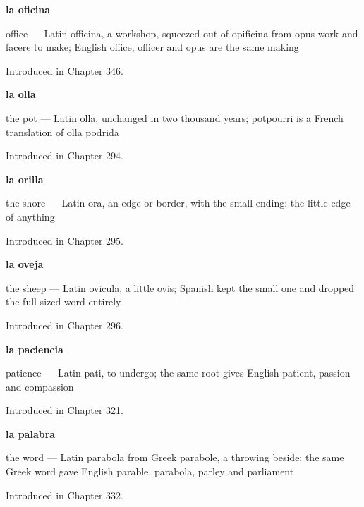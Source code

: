 \noindent\begin{minipage}[t]{\linewidth}
\raggedright
\textbf{la oficina}\par
\small office — Latin officina, a workshop, squeezed out of opificina from opus work and facere to make; English office, officer and opus are the same making\par
\footnotesize Introduced in Chapter 346.
\end{minipage}\par\medskip

\noindent\begin{minipage}[t]{\linewidth}
\raggedright
\textbf{la olla}\par
\small the pot — Latin olla, unchanged in two thousand years; potpourri is a French translation of olla podrida\par
\footnotesize Introduced in Chapter 294.
\end{minipage}\par\medskip

\noindent\begin{minipage}[t]{\linewidth}
\raggedright
\textbf{la orilla}\par
\small the shore — Latin ora, an edge or border, with the small ending: the little edge of anything\par
\footnotesize Introduced in Chapter 295.
\end{minipage}\par\medskip

\noindent\begin{minipage}[t]{\linewidth}
\raggedright
\textbf{la oveja}\par
\small the sheep — Latin ovicula, a little ovis; Spanish kept the small one and dropped the full-sized word entirely\par
\footnotesize Introduced in Chapter 296.
\end{minipage}\par\medskip

\noindent\begin{minipage}[t]{\linewidth}
\raggedright
\textbf{la paciencia}\par
\small patience — Latin pati, to undergo; the same root gives English patient, passion and compassion\par
\footnotesize Introduced in Chapter 321.
\end{minipage}\par\medskip

\noindent\begin{minipage}[t]{\linewidth}
\raggedright
\textbf{la palabra}\par
\small the word — Latin parabola from Greek parabole, a throwing beside; the same Greek word gave English parable, parabola, parley and parliament\par
\footnotesize Introduced in Chapter 332.
\end{minipage}\par\medskip

